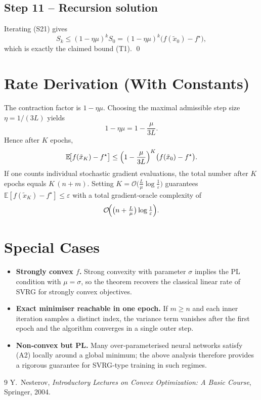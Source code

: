 \documentclass{article}
\newcommand{\EE}{\mathbb{E}}
\begin{document}
\subsection*{Step 11 – Recursion solution}
Iterating (S21) gives
\[
S_k\le (1-\eta\mu)^{k}S_0
    = (1-\eta\mu)^{k}\bigl(f(\tilde x_0)-f^{\star}\bigr), \tag{S22}
\]
which is exactly the claimed bound (T1).  \qed

\section*{Rate Derivation (With Constants)}
The contraction factor is $1-\eta\mu$.  Choosing the maximal admissible
step size $\eta=1/(3L)$ yields
\[
1-\eta\mu = 1-\frac{\mu}{3L}.
\]
Hence after $K$ epochs,
\[
\EE\!\bigl[f(\tilde x_K)-f^{\star}\bigr]
\le \Bigl(1-\frac{\mu}{3L}\Bigr)^{K}
   \bigl(f(\tilde x_0)-f^{\star}\bigr).
\]
If one counts individual stochastic gradient evaluations,
the total number after $K$ epochs equals $K\,(n+m)$.  Setting
$K=\mathcal O\!\bigl(\tfrac{L}{\mu}\log\tfrac{1}{\varepsilon}\bigr)$
guarantees $\EE[f(\tilde x_K)-f^{\star}]\le\varepsilon$ with a total
gradient‑oracle complexity of
\[
\mathcal O\!\Bigl(\bigl(n+\tfrac{L}{\mu}\bigr)\log\tfrac{1}{\varepsilon}\Bigr).
\]

\section*{Special Cases}
\begin{itemize}
\item \textbf{Strongly convex $f$.} Strong convexity with parameter $\sigma$
implies the PL condition with $\mu=\sigma$, so the theorem recovers the
classical linear rate of SVRG for strongly convex objectives.
\item \textbf{Exact minimiser reachable in one epoch.} If $m\ge n$ and each
inner iteration samples a distinct index, the variance term vanishes after
the first epoch and the algorithm converges in a single outer step.
\item \textbf{Non‑convex but PL.} Many over‑parameterised neural networks satisfy
(A2) locally around a global minimum; the above analysis therefore provides
a rigorous guarantee for SVRG‑type training in such regimes.
\end{itemize}

\begin{thebibliography}{9}
Y.~Nesterov,
\textit{Introductory Lectures on Convex Optimization: A Basic Course},
Springer, 2004.
\end{thebibliography}
\end{document}
